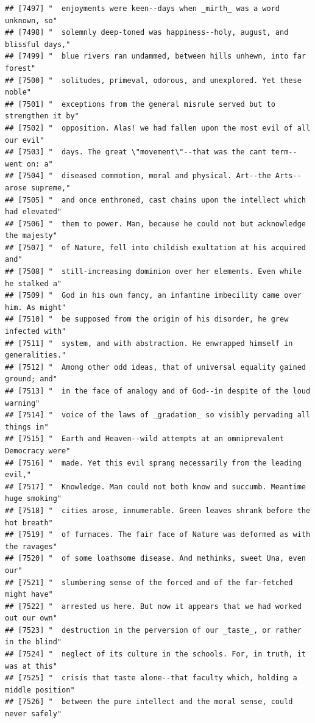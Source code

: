 \documentclass{article}\usepackage[]{graphicx}\usepackage[]{color}
\makeatletter
\newenvironment{kframe}{%
 \def\at@end@of@kframe{}%
 \ifinner\ifhmode%
  \def\at@end@of@kframe{\end{minipage}}%
  \begin{minipage}{\columnwidth}%
 \fi\fi%
 \def\FrameCommand##1{\hskip\@totalleftmargin \hskip-\fboxsep
 \colorbox{shadecolor}{##1}\hskip-\fboxsep
     \hskip-\linewidth \hskip-\@totalleftmargin \hskip\columnwidth}%
 \MakeFramed {\advance\hsize-\width
   \@totalleftmargin\z@ \linewidth\hsize
   \@setminipage}}%
 {\par\unskip\endMakeFramed%
 \at@end@of@kframe}
\newenvironment{knitrout}{}{} %
\makeatother
\begin{document}
\begin{knitrout}
\begin{kframe}
\begin{verbatim}
## [7497] "  enjoyments were keen--days when _mirth_ was a word unknown, so"            
## [7498] "  solemnly deep-toned was happiness--holy, august, and blissful days,"       
## [7499] "  blue rivers ran undammed, between hills unhewn, into far forest"           
## [7500] "  solitudes, primeval, odorous, and unexplored. Yet these noble"             
## [7501] "  exceptions from the general misrule served but to strengthen it by"        
## [7502] "  opposition. Alas! we had fallen upon the most evil of all our evil"        
## [7503] "  days. The great \"movement\"--that was the cant term--went on: a"          
## [7504] "  diseased commotion, moral and physical. Art--the Arts--arose supreme,"     
## [7505] "  and once enthroned, cast chains upon the intellect which had elevated"     
## [7506] "  them to power. Man, because he could not but acknowledge the majesty"      
## [7507] "  of Nature, fell into childish exultation at his acquired and"              
## [7508] "  still-increasing dominion over her elements. Even while he stalked a"      
## [7509] "  God in his own fancy, an infantine imbecility came over him. As might"     
## [7510] "  be supposed from the origin of his disorder, he grew infected with"        
## [7511] "  system, and with abstraction. He enwrapped himself in generalities."       
## [7512] "  Among other odd ideas, that of universal equality gained ground; and"      
## [7513] "  in the face of analogy and of God--in despite of the loud warning"         
## [7514] "  voice of the laws of _gradation_ so visibly pervading all things in"       
## [7515] "  Earth and Heaven--wild attempts at an omniprevalent Democracy were"        
## [7516] "  made. Yet this evil sprang necessarily from the leading evil,"             
## [7517] "  Knowledge. Man could not both know and succumb. Meantime huge smoking"     
## [7518] "  cities arose, innumerable. Green leaves shrank before the hot breath"      
## [7519] "  of furnaces. The fair face of Nature was deformed as with the ravages"     
## [7520] "  of some loathsome disease. And methinks, sweet Una, even our"              
## [7521] "  slumbering sense of the forced and of the far-fetched might have"          
## [7522] "  arrested us here. But now it appears that we had worked out our own"       
## [7523] "  destruction in the perversion of our _taste_, or rather in the blind"      
## [7524] "  neglect of its culture in the schools. For, in truth, it was at this"      
## [7525] "  crisis that taste alone--that faculty which, holding a middle position"    
## [7526] "  between the pure intellect and the moral sense, could never safely"        

\end{verbatim}
\end{kframe}
\end{knitrout}
\end{document}
